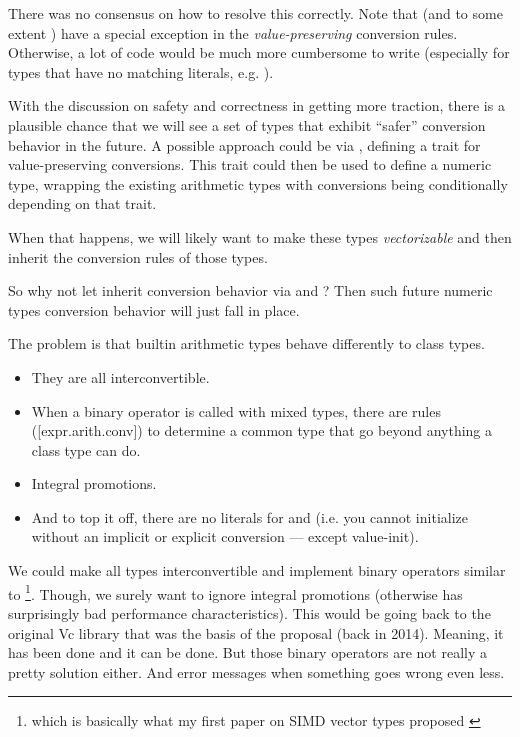 There was no consensus on how to resolve this correctly.
Note that  (and to some extent ) have a special
exception in the \emph{value-preserving} conversion rules.
Otherwise, a lot of code would be much more cumbersome to write (especially for
types that have no matching literals, e.g. ).

With the discussion on safety and correctness in \CC{} getting more traction,
there is a plausible chance that we will see a set of types that exhibit
``safer'' conversion behavior in the future.
A possible approach could be via \cite{P2509R0}, defining a trait for
value-preserving conversions.
This trait could then be used to define a numeric type, wrapping the existing
arithmetic types with conversions being conditionally  depending
on that trait.

When that happens, we will likely want to make these types \emph{vectorizable}
and then inherit the conversion rules of those types.

So why not let  inherit conversion behavior via
\std{} and \std{}?
Then such future numeric types conversion behavior will just fall in place.

The problem is that builtin arithmetic types behave differently to class types.
\begin{itemize}
  \item They are all interconvertible.
  \item When a binary operator is called with mixed types, there are rules
    ([expr.arith.conv]) to determine a common type that go beyond anything a
    class type can do.
  \item Integral promotions.
  \item And to top it off, there are no literals for  and
     (i.e. you cannot initialize without an implicit or
    explicit conversion --- except value-init).
\end{itemize}

We could make all  types interconvertible and implement binary
operators similar to \footnote{which is basically what my first paper on SIMD vector types
proposed \cite{N4184}}.
Though, we surely want to ignore integral promotions (otherwise
 has surprisingly bad performance
characteristics).
This would be going back to the original Vc library that was the basis of the
 proposal (back in 2014).
Meaning, it has been done and it can be done.
But those binary operators are not really a pretty solution either.
And error messages when something goes wrong even less.

